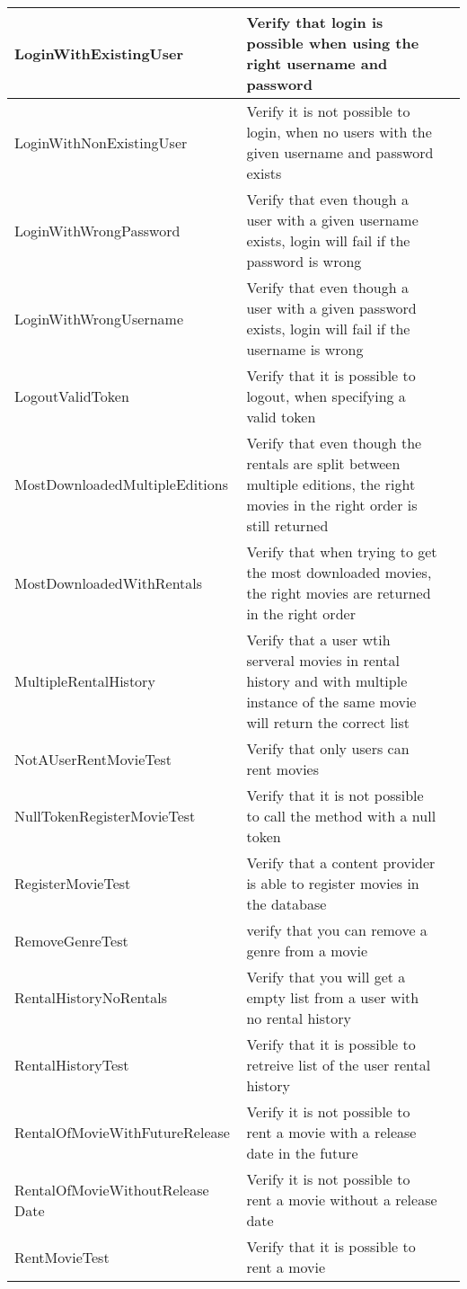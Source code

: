 \begin{centering}
\begin{longtable}{| p{5 cm} | p{9 cm} | c |}
\hline
LoginWithExistingUser & Verify that login is possible when using the right username and password & \\
\hline
LoginWithNonExistingUser & Verify it is not possible to login, when no users with the given username and password exists & \\
\hline
LoginWithWrongPassword & Verify that even though a user with a given username exists, login will fail if the password is wrong & \\
\hline
LoginWithWrongUsername & Verify that even though a user with a given password exists, login will fail if the username is wrong & \\
\hline
LogoutValidToken & Verify that it is possible to logout, when specifying a valid token & \\
\hline
MostDownloadedMultipleEditions & Verify that even though the rentals are split between multiple editions, the right movies in the right order is still returned & \\
\hline
MostDownloadedWithRentals & Verify that when trying to get the most downloaded movies, the right movies are returned in the right order & \\
\hline
MultipleRentalHistory & Verify that a user wtih serveral movies in rental history and with multiple instance of the same movie will return the correct list & \\
\hline
NotAUserRentMovieTest & Verify that only users can rent movies & \\
\hline
NullTokenRegisterMovieTest & Verify that it is not possible to call the method with a null token & \\
\hline
RegisterMovieTest & Verify that a content provider is able to register movies in the database & \\
\hline
RemoveGenreTest & verify that you can remove a genre from a movie & \\
\hline
RentalHistoryNoRentals & Verify that you will get a empty list from a user with no rental history & \\
\hline
RentalHistoryTest & Verify that it is possible to retreive list of the user rental history & \\
\hline
RentalOfMovieWithFutureRelease & Verify it is not possible to rent a movie with a release date in the future & \\
\hline
RentalOfMovieWithoutRelease Date & Verify it is not possible to rent a movie without a release date & \\
\hline
RentMovieTest & Verify that it is possible to rent a movie & \\

\end{longtable}
\end{centering}
